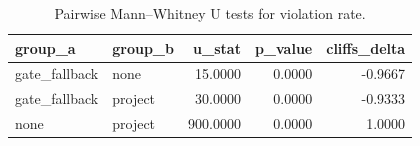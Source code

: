 \begin{table}
\caption{Pairwise Mann–Whitney U tests for violation rate.}
\label{tab:violation_pairwise}
\begin{tabular}{llrrr}
\toprule
group_a & group_b & u_stat & p_value & cliffs_delta \\
\midrule
gate_fallback & none & 15.0000 & 0.0000 & -0.9667 \\
gate_fallback & project & 30.0000 & 0.0000 & -0.9333 \\
none & project & 900.0000 & 0.0000 & 1.0000 \\
\bottomrule
\end{tabular}
\end{table}
